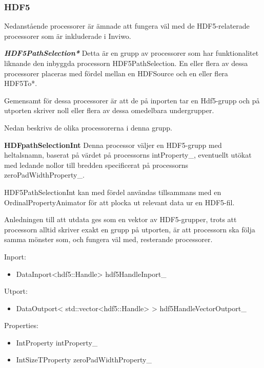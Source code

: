 \subsubsection{HDF5}
\label{ch:hdf5-processorer}
Nedanstående processorer är ämnade att fungera väl med de HDF5-relaterade processorer som är inkluderade i Inviwo.

\textbf{\textit{HDF5PathSelection*}} \newline
Detta är en grupp av processorer som har funktionalitet liknande den inbyggda processorn HDF5PathSelection. En eller flera av dessa processorer placeras med fördel mellan en HDFSource och en eller flera HDF5To*.

Gemensamt för dessa processorer är  att de på inporten tar en Hdf5-grupp och på utporten skriver noll eller flera av dessa omedelbara undergrupper.

Nedan beskrivs de olika processorerna i denna grupp.

\textbf{HDFpathSelectionInt} \newline
Denna processor väljer en HDF5-grupp med heltalsnamn, baserat på värdet på processorns intProperty\_, eventuellt utökat med ledande nollor till bredden specificerat på processorns zeroPadWidthProperty\_.

HDF5PathSelectionInt kan med fördel användas tillsammans med en OrdinalPropertyAnimator för att plocka ut relevant data ur en HDF5-fil.

Anledningen till att utdata ges som en vektor av HDF5-grupper, trots att processorn alltid skriver exakt en grupp på utporten, är att processorn ska följa samma mönster som, och fungera väl med, resterande processorer.

Inport:
\begin{itemize}
\item DataInport<hdf5::Handle> hdf5HandleInport\_
\end{itemize}

Utport:
\begin{itemize}
\item DataOutport< std::vector<hdf5::Handle> > hdf5HandleVectorOutport\_
\end{itemize}

Properties:
\begin{itemize}
    \setlength\itemsep{0em}
    \item IntProperty intProperty\_
    \item IntSizeTProperty zeroPadWidthProperty\_
\end{itemize}

